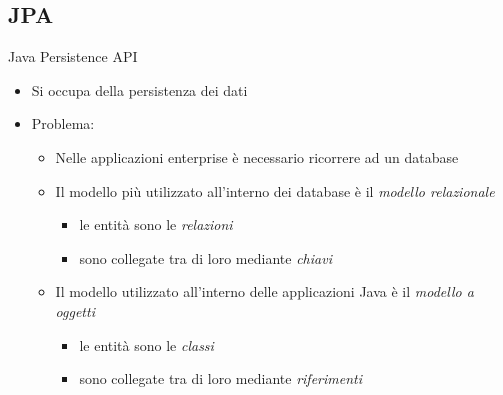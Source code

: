 \subsection{JPA}
\begin{frame}{Java Persistence API}

\begin{itemize}
\item Si occupa della persistenza dei dati
\end{itemize}

\vspace{0.4em}

\begin{itemize}
\item Problema:

	\begin{itemize}
	
	\vspace{0.4em}

	\item Nelle applicazioni enterprise è necessario ricorrere ad un database
	
	\vspace{0.7em}
	
	\item Il modello più utilizzato all'interno dei database è il \textsl{modello relazionale}
		\begin{itemize}
		\item le entità sono le \textsl{relazioni}
		\item sono collegate tra di loro mediante \textsl{chiavi}
		\end{itemize}
		
	\vspace{0.7em}
	
	\item Il modello utilizzato all'interno delle applicazioni Java è il \textsl{modello a oggetti}
		\begin{itemize}
		\item le entità sono le \textsl{classi}
		\item sono collegate tra di loro mediante \textsl{riferimenti}
		\end{itemize}
	
	\end{itemize}

\end{itemize}

\end{frame}


